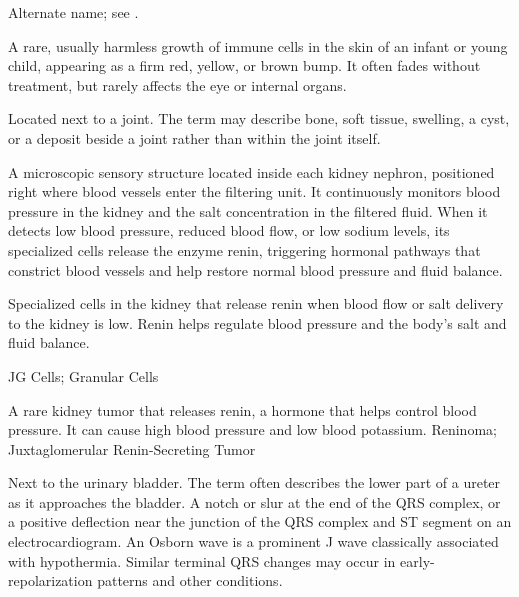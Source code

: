  Alternate name; see .

 A rare, usually harmless growth of immune cells in the skin of an infant or young child, appearing as a firm red, yellow, or brown bump. It often fades without treatment, but rarely affects the eye or internal organs.

 Located next to a joint. The term may describe bone, soft tissue, swelling, a cyst, or a deposit beside a joint rather than within the joint itself.

 A microscopic sensory structure located inside each kidney nephron, positioned right where blood vessels enter the filtering unit. It continuously monitors blood pressure in the kidney and the salt concentration in the filtered fluid. When it detects low blood pressure, reduced blood flow, or low sodium levels, its specialized cells release the enzyme renin, triggering hormonal pathways that constrict blood vessels and help restore normal blood pressure and fluid balance.

 Specialized cells in the kidney that release renin when blood flow or salt delivery to the kidney is low. Renin helps regulate blood pressure and the body's salt and fluid balance.

\synonyms
JG Cells; Granular Cells

 A rare kidney tumor that releases renin, a hormone that helps control blood pressure. It can cause high blood pressure and low blood potassium.
\synonyms
Reninoma; Juxtaglomerular Renin-Secreting Tumor

 Next to the urinary bladder. The term often describes the lower part of a ureter as it approaches the bladder.
 A notch or slur at the end of the QRS complex, or a positive deflection near the junction of the QRS complex and ST segment on an electrocardiogram. An Osborn wave is a prominent J wave classically associated with hypothermia. Similar terminal QRS changes may occur in early-repolarization patterns and other conditions.
